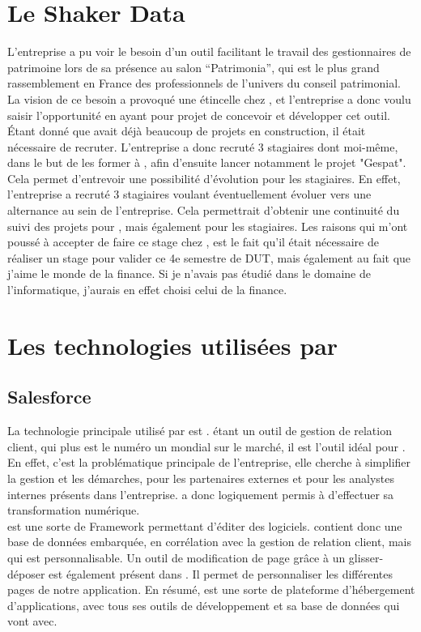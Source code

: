 \documentclass[12pt,oneside,noprintercorrection]{iut}
\begin{document}
\section{Le Shaker Data}
L'entreprise a pu voir le besoin d'un outil facilitant le travail des gestionnaires de patrimoine lors de sa présence au salon ``Patrimonia'', qui est le plus grand rassemblement en France des professionnels de l’univers du conseil patrimonial. La vision de ce besoin a provoqué une étincelle chez \gz{}, et l'entreprise a donc voulu saisir l'opportunité en ayant pour projet de concevoir et développer cet outil. Étant donné que \gz{} avait déjà beaucoup de projets en construction, il était nécessaire de recruter. L'entreprise a donc recruté 3 stagiaires dont moi-même, dans le but de les former à \slf{}, afin d'ensuite lancer notamment le projet "Gespat". Cela permet d'entrevoir une possibilité d'évolution pour les stagiaires. En effet, l'entreprise a recruté 3 stagiaires voulant éventuellement évoluer vers une alternance au sein de l'entreprise. Cela permettrait d'obtenir une continuité du suivi des projets pour \gz{}, mais également pour les stagiaires. Les raisons qui m'ont poussé à accepter de faire ce stage chez \glaz{}, est le fait qu'il était nécessaire de réaliser un stage pour valider ce 4e semestre de DUT, mais également au fait que j'aime le monde de la finance. Si je n'avais pas étudié dans le domaine de l'informatique, j'aurais  en effet choisi celui de la finance.

\section{Les technologies utilisées par \gz{}}
\subsection{Salesforce}
La technologie principale utilisé par \glaz{} est \slf{}. \slf{} étant un outil de gestion de relation client, qui plus est le numéro un mondial sur le marché, il est l'outil idéal pour \gz{}. En effet, c'est la problématique principale de l'entreprise, elle cherche à simplifier la gestion et les démarches, pour les partenaires externes et pour les analystes internes présents dans l'entreprise. \slf{} a donc logiquement permis à \gz{} d'effectuer sa transformation numérique.
~\\\indent \slf{} est une sorte de Framework permettant d'éditer des logiciels. \slf{} contient donc une base de données embarquée, en corrélation avec la gestion de relation client, mais qui est personnalisable.
Un outil de modification de page grâce à un glisser-déposer est également présent dans \slf{}. Il permet de personnaliser les différentes pages de notre application. En résumé, \slf{} est une sorte de plateforme d'hébergement d'applications, avec tous ses outils de développement et sa base de données qui vont avec.
\end{document}
